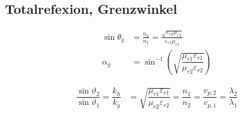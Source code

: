 
\subsection{Totalrefexion, Grenzwinkel}
\begin{align*}
    \sin\theta_g & = \frac{n_2}{n_1} = \frac{\sqrt{\varepsilon_{r2}\mu_{r2}}}{\varepsilon_{r1}\mu_{r1}}\\
    \alpha_g & = \sin^{-1} \left( \sqrt{ \dfrac{\mu_{r1} \varepsilon_{r1}}{\mu_{r2} \varepsilon_{r2}}} \right)
\end{align*}

\begin{align*}
    \dfrac{\sin \vartheta_{2}}{\sin \vartheta_{1}} = \dfrac{k_{h}}{k_{g}} & = \sqrt{\dfrac{\mu_{r 1} \varepsilon_{r 1}}{\mu_{r 2} \varepsilon_{r 2}}} = \dfrac{n_{1}}{n_{2}} = \dfrac{v_{p, 2}}{v_{p, 1}} = \dfrac{\lambda_{2}}{\lambda_{1}} \\
\end{align*}

